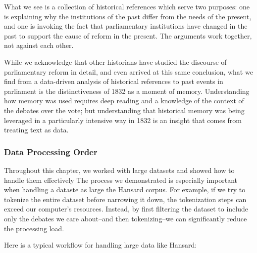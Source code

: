 \documentclass[
]{article}
\newcounter{chapter}
\begin{document}
What we see is a collection of historical references which serve two
purposes: one is explaining why the institutions of the past differ from
the needs of the present, and one is invoking the fact that
parliamentary institutions have changed in the past to support the cause
of reform in the present. The arguments work together, not against each
other.

While we acknowledge that other historians have studied the discourse of
parliamentary reform in detail, and even arrived at this same
conclusion, what we find from a data-driven analysis of historical
references to past events in parliament is the distinctiveness of 1832
as a moment of memory. Understanding how memory was used requires deep
reading and a knowledge of the context of the debates over the vote; but
understanding that historical memory was being leveraged in a
particularly intensive way in 1832 is an insight that comes from
treating text as data.

\subsubsection{Data Processing Order}\label{data-processing-order}

Throughout this chapter, we worked with large datasets and showed how to
handle them effectively The process we demonstrated is especially
important when handling a dataste as large the Hansard corpus. For
example, if we try to tokenize the entire dataset before narrowing it
down, the tokenization steps can exceed our computer's resources.
Instead, by first filtering the dataset to include only the debates we
care about--and then tokenizing--we can significantly reduce the
processing load.

Here is a typical workflow for handling large data like Hansard:
\end{document}
